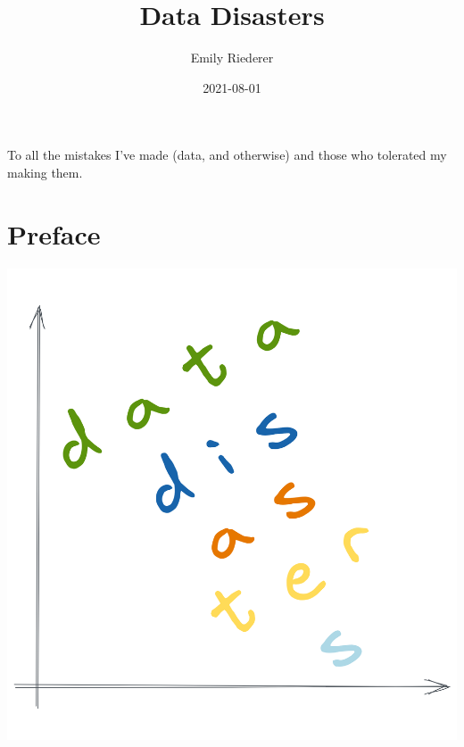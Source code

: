 \documentclass[
]{krantz}
\title{Data Disasters}
\author{Emily Riederer}
\date{2021-08-01}
\begin{document}
\maketitle


\thispagestyle{empty}

\begin{center}
To all the mistakes I've made (data, and otherwise) and those who tolerated my making them.
\end{center}

\setlength{\abovedisplayskip}{-5pt}
\setlength{\abovedisplayshortskip}{-5pt}

{
\hypersetup{linkcolor=}
\setcounter{tocdepth}{2}
\tableofcontents
}
\listoftables
\listoffigures
\hypertarget{preface}{%
\chapter*{Preface}\label{preface}}


\begin{center}\includegraphics[width=0.9\linewidth]{figures/cover} \end{center}
\end{document}
